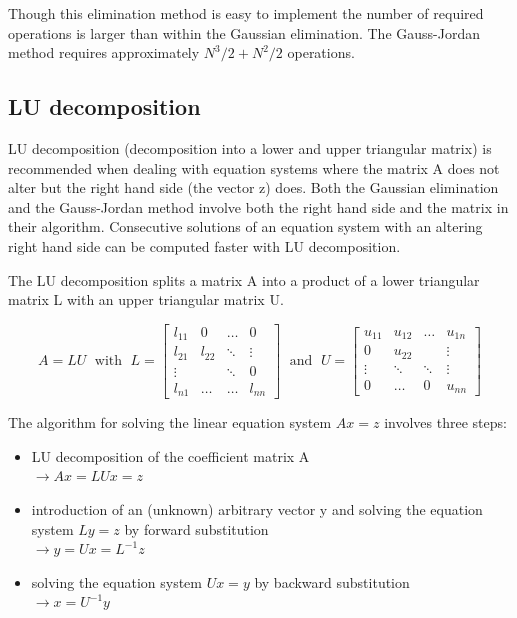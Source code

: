 \documentclass[10pt]{report}
\begin{document}
\addvspace{12pt}

Though this elimination method is easy to implement the number of
required operations is larger than within the Gaussian elimination.
The Gauss-Jordan method requires approximately $N^3/2 + N^2/2$
operations.

\subsection{LU decomposition}

LU decomposition (decomposition into a lower and upper triangular
matrix) is recommended when dealing with equation systems where the
matrix A does not alter but the right hand side (the vector z) does.
Both the Gaussian elimination and the Gauss-Jordan method involve both
the right hand side and the matrix in their algorithm.  Consecutive
solutions of an equation system with an altering right hand side can
be computed faster with LU decomposition.

\addvspace{12pt}

The LU decomposition splits a matrix A into a product of a lower
triangular matrix L with an upper triangular matrix U.

\begin{equation}
A = L U \;\text{ with }\;
L = 
\begin{bmatrix}
l_{11} & 0 & \ldots & 0\\
l_{21} & l_{22} & \ddots & \vdots\\
\vdots &  & \ddots & 0\\
l_{n1} & \ldots & \ldots & l_{nn}
\end{bmatrix}
\;\text{ and }\;
U =
\begin{bmatrix}
u_{11} & u_{12} & \ldots & u_{1n}\\
0 & u_{22} &  & \vdots\\
\vdots & \ddots & \ddots & \vdots\\
0 & \ldots & 0 & u_{nn}
\end{bmatrix}
\end{equation}

The algorithm for solving the linear equation system $Ax = z$ involves
three steps:
\begin{itemize}
\item LU decomposition of the coefficient matrix A\\
$\rightarrow Ax = LUx = z$
\item introduction of an (unknown) arbitrary vector y and solving the equation system $Ly = z$ by forward substitution\\
$\rightarrow y = Ux = L^{-1}z$
\item solving the equation system $Ux = y$  by backward substitution\\
$\rightarrow x = U^{-1}y$
\end{itemize}
\end{document}
